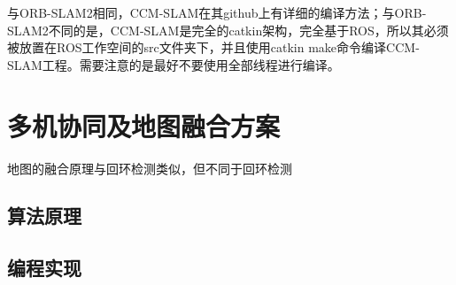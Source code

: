 与ORB-SLAM2相同，CCM-SLAM在其github上有详细的编译方法；与ORB-SLAM2不同的是，CCM-SLAM是完全的catkin架构，完全基于ROS，所以其必须被放置在ROS工作空间的src文件夹下，并且使用catkin make命令编译CCM-SLAM工程。需要注意的是最好不要使用全部线程进行编译。


\section{多机协同及地图融合方案}

地图的融合原理与回环检测类似，但不同于回环检测



\subsection{算法原理} \label{3.4.1}






\subsection{编程实现} \label{3.4.2}










